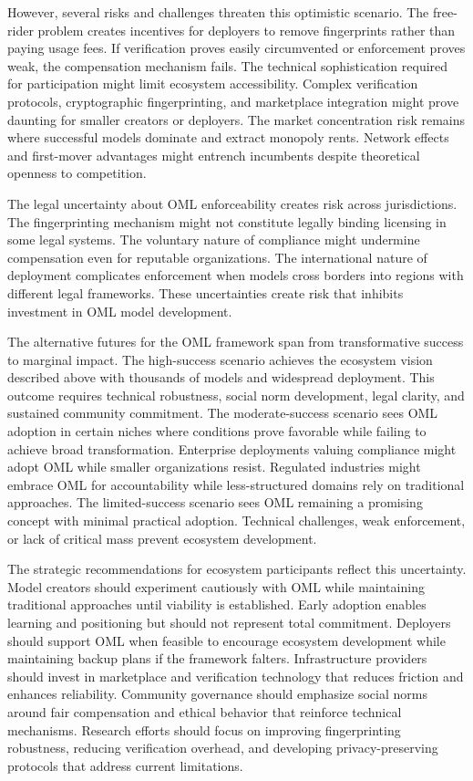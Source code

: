 However, several risks and challenges threaten this optimistic scenario. The free-rider problem creates incentives for deployers to remove fingerprints rather than paying usage fees. If verification proves easily circumvented or enforcement proves weak, the compensation mechanism fails. The technical sophistication required for participation might limit ecosystem accessibility. Complex verification protocols, cryptographic fingerprinting, and marketplace integration might prove daunting for smaller creators or deployers. The market concentration risk remains where successful models dominate and extract monopoly rents. Network effects and first-mover advantages might entrench incumbents despite theoretical openness to competition.

The legal uncertainty about OML enforceability creates risk across jurisdictions. The fingerprinting mechanism might not constitute legally binding licensing in some legal systems. The voluntary nature of compliance might undermine compensation even for reputable organizations. The international nature of deployment complicates enforcement when models cross borders into regions with different legal frameworks. These uncertainties create risk that inhibits investment in OML model development.

The alternative futures for the OML framework span from transformative success to marginal impact. The high-success scenario achieves the ecosystem vision described above with thousands of models and widespread deployment. This outcome requires technical robustness, social norm development, legal clarity, and sustained community commitment. The moderate-success scenario sees OML adoption in certain niches where conditions prove favorable while failing to achieve broad transformation. Enterprise deployments valuing compliance might adopt OML while smaller organizations resist. Regulated industries might embrace OML for accountability while less-structured domains rely on traditional approaches. The limited-success scenario sees OML remaining a promising concept with minimal practical adoption. Technical challenges, weak enforcement, or lack of critical mass prevent ecosystem development.

The strategic recommendations for ecosystem participants reflect this uncertainty. Model creators should experiment cautiously with OML while maintaining traditional approaches until viability is established. Early adoption enables learning and positioning but should not represent total commitment. Deployers should support OML when feasible to encourage ecosystem development while maintaining backup plans if the framework falters. Infrastructure providers should invest in marketplace and verification technology that reduces friction and enhances reliability. Community governance should emphasize social norms around fair compensation and ethical behavior that reinforce technical mechanisms. Research efforts should focus on improving fingerprinting robustness, reducing verification overhead, and developing privacy-preserving protocols that address current limitations.

